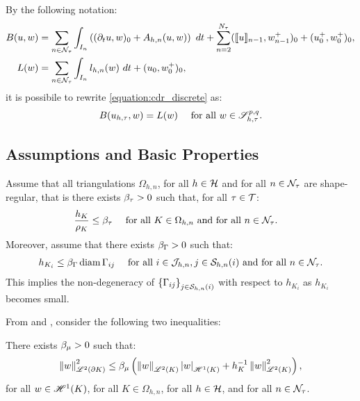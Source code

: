 By the following notation:
\begin{align}
    B(u, w) &= \sum_{n \in \mathcal{N}_{\tau}} \int_{I_n} \left( (\partial_t u, w )_0 + A_{h, n}(u, w) \right) ~ dt + \sum_{n = 2}^{N_{\tau}} (\llbracket u \rrbracket_{n - 1}, w_{n - 1}^+ )_0 + (u_0^+, w_0^+ )_0, \label{equation:cdr_B} \\
    L(w) &= \sum_{n \in \mathcal{N}_{\tau}} \int_{I_n} l_{h, n}(w) ~ dt + (u_0, w_0^+ )_0 \label{equation:cdr_L},
\end{align}
it is possibile to rewrite \cref{equation:cdr_discrete} as:
\begin{align}
    B(u_{h, \tau}, w) &= L(w) &\text{ for all } w \in \mathscr{S}^{p, q}_{h, \tau}. \label{equation:cdr_discrete_short}
\end{align}

\newpage
\subsection{Assumptions and Basic Properties}

Assume that all triangulations $\Omega_{h, n}$, for all $h \in \mathcal{H}$ and for all $n \in \mathcal{N}_{\tau}$ are shape-regular, that is there exists $\beta_{\tau} > 0$ such that, for all $\tau \in \mathcal{T}$:
\begin{align}
    \frac{h_K}{\rho_K} &\leq \beta_{\tau} &\text{ for all } K \in \Omega_{h, n} \text{ and for all } n \in \mathcal{N}_{\tau}. \label{equation:ass_h}
&\end{align}
Moreover, assume that there exists $\beta_{\Gamma} > 0$ such that:
\begin{align}
    h_{K_i} &\leq \beta_{\Gamma} \operatorname*{diam} \Gamma_{ij} &\text{ for all } i \in \mathcal{J}_{h, n}, j \in \mathcal{S}_{h, n}(i) \text{ and for all } n \in \mathcal{N}_{\tau}. \label{equation:ass_hd}
\end{align}
This implies the non-degeneracy of $\left\{ \Gamma_{ij} \right\}_{j \in \mathcal{S}_{h, n}(i)}$ with respect to $h_{K_i}$ as $h_{K_i}$ becomes small.

From \cite{Dolejší2002} and \cite{Ciarlet1978}, consider the following two inequalities:

\begin{lemma}
    There exists $\beta_{\mu} > 0$ such that:
    \begin{align}
        \left\lVert w \right\rVert_{\mathscr{L}^{2}(\partial K)}^2 \leq \beta_{\mu} \left( \left\lVert w \right\rVert_{\mathscr{L}^{2}(K)} \left\lvert w \right\rvert_{\mathscr{H}^{1}(K)} + h_K^{-1} \left\lVert w \right\rVert_{\mathscr{L}^{2}(K)}^2 \right),
    \end{align}
    for all $w \in \mathscr{H}^{1}(K)$, for all $K \in \Omega_{h, n}$, for all $h \in \mathcal{H}$, and for all $n \in \mathcal{N}_{\tau}$.
\end{lemma}

